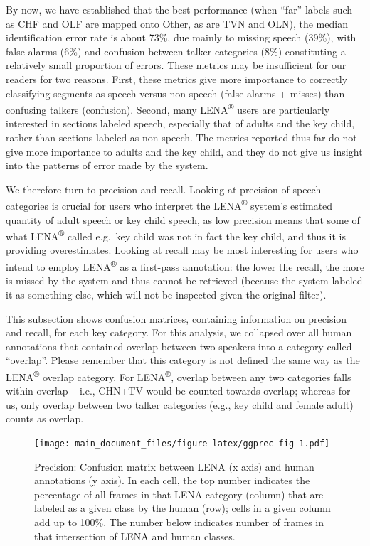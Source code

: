 \documentclass[english,table,man,floatsintext]{apa6}
\begin{document}
By now, we have established that the best performance (when \enquote{far} labels such as CHF and OLF are mapped onto Other, as are TVN and OLN), the median identification error rate is about 73\%, due mainly to missing speech (39\%), with false alarms (6\%) and confusion between talker categories (8\%) constituting a relatively small proportion of errors. These metrics may be insufficient for our readers for two reasons. First, these metrics give more importance to correctly classifying segments as speech versus non-speech (false alarms + misses) than confusing talkers (confusion). Second, many LENA\textsuperscript{®} users are particularly interested in sections labeled speech, especially that of adults and the key child, rather than sections labeled as non-speech. The metrics reported thus far do not give more importance to adults and the key child, and they do not give us insight into the patterns of error made by the system.

We therefore turn to precision and recall. Looking at precision of speech categories is crucial for users who interpret the LENA\textsuperscript{®} system's estimated quantity of adult speech or key child speech, as low precision means that some of what LENA\textsuperscript{®} called e.g.~key child was not in fact the key child, and thus it is providing overestimates. Looking at recall may be most interesting for users who intend to employ LENA\textsuperscript{®} as a first-pass annotation: the lower the recall, the more is missed by the system and thus cannot be retrieved (because the system labeled it as something else, which will not be inspected given the original filter).

This subsection shows confusion matrices, containing information on precision and recall, for each key category. For this analysis, we collapsed over all human annotations that contained overlap between two speakers into a category called \enquote{overlap}. Please remember that this category is not defined the same way as the LENA\textsuperscript{®} overlap category. For LENA\textsuperscript{®}, overlap between any two categories falls within overlap -- i.e., CHN+TV would be counted towards overlap; whereas for us, only overlap between two talker categories (e.g., key child and female adult) counts as overlap.

\begin{figure}
\centering
\texttt{[image: main\_document\_files/figure-latex/ggprec-fig-1.pdf]}
\caption{\label{fig:ggprec-fig}Precision: Confusion matrix between LENA (x axis) and human annotations (y axis). In each cell, the top number indicates the percentage of all frames in that LENA category (column) that are labeled as a given class by the human (row); cells in a given column add up to 100\%. The number below indicates number of frames in that intersection of LENA and human classes.}
\end{figure}
\end{document}
